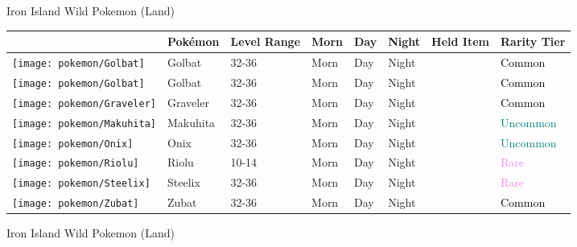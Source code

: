 \caption{Iron Island Wild Pokemon (Land)}%
\begin{longtable}{||l l l l l l l l||}%
\hline%
&Pokémon&Level Range&Morn&Day&Night&Held Item&Rarity Tier\\%
\hline%
\endhead%
\hline%
\texttt{[image: pokemon/Golbat]}&Golbat&32{-}36&Morn&Day&Night&&\textcolor{black}{%
Common%
}\\%
\hline%
\texttt{[image: pokemon/Golbat]}&Golbat&32{-}36&Morn&Day&Night&&\textcolor{black}{%
Common%
}\\%
\hline%
\texttt{[image: pokemon/Graveler]}&Graveler&32{-}36&Morn&Day&Night&&\textcolor{black}{%
Common%
}\\%
\hline%
\texttt{[image: pokemon/Makuhita]}&Makuhita&32{-}36&Morn&Day&Night&&\textcolor{teal}{%
Uncommon%
}\\%
\hline%
\texttt{[image: pokemon/Onix]}&Onix&32{-}36&Morn&Day&Night&&\textcolor{teal}{%
Uncommon%
}\\%
\hline%
\texttt{[image: pokemon/Riolu]}&Riolu&10{-}14&Morn&Day&Night&&\textcolor{violet}{%
Rare%
}\\%
\hline%
\texttt{[image: pokemon/Steelix]}&Steelix&32{-}36&Morn&Day&Night&&\textcolor{violet}{%
Rare%
}\\%
\hline%
\texttt{[image: pokemon/Zubat]}&Zubat&32{-}36&Morn&Day&Night&&\textcolor{black}{%
Common%
}\\%
\hline%
\end{longtable}%
\caption{Iron Island Wild Pokemon (Land)}